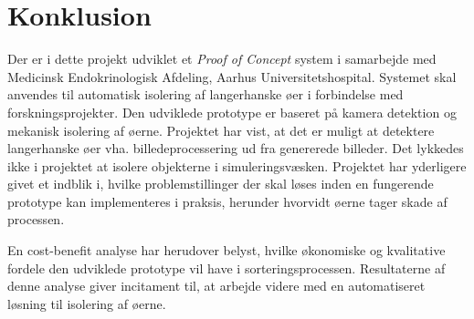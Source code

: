 \chapter{Konklusion}
Der er i dette projekt udviklet et \textit{Proof of Concept} system i samarbejde med Medicinsk Endokrinologisk Afdeling, Aarhus Universitetshospital. Systemet skal anvendes til automatisk isolering af langerhanske øer i forbindelse med forskningsprojekter. Den udviklede prototype er baseret på kamera detektion og mekanisk isolering af øerne. Projektet har vist, at det er muligt at detektere langerhanske øer vha. billedeprocessering ud fra genererede billeder. Det lykkedes ikke i projektet at isolere objekterne i simuleringsvæsken. Projektet har yderligere givet et indblik i, hvilke problemstillinger der skal løses inden en fungerende prototype kan implementeres i praksis, herunder hvorvidt øerne tager skade af processen. 

En cost-benefit analyse har herudover belyst, hvilke økonomiske og kvalitative fordele den udviklede prototype vil have i sorteringsprocessen. Resultaterne af denne analyse giver incitament til, at arbejde videre med en automatiseret løsning til isolering af øerne. 

